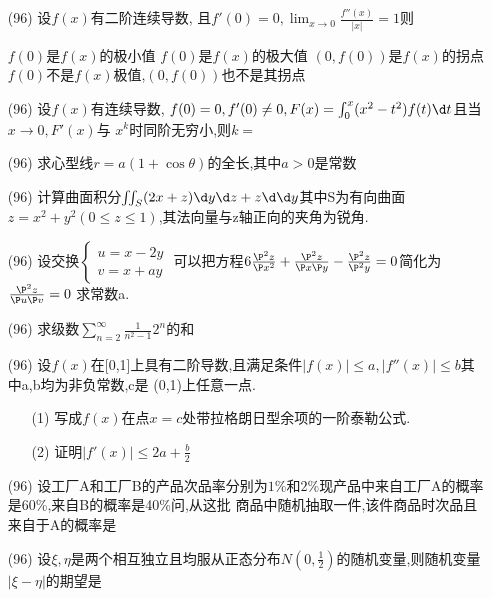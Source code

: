 \documentclass[12pt, a4paper, oneside, UTF8]{ctexbook}
\begin{document}
\begin{enumerate}
    \item [(96)] 设$f(x)$有二阶连续导数, 且$f'(0)=0,\lim_{x\to 0}\frac{f''(x)}{\left|x\right|} = 1$则
    \begin{choices}[1]
        \task $f(0)$是$f(x)$的极小值
        \task $f(0)$是$f(x)$的极大值
        \task $(0, f(0))$是$f(x)$的拐点 
        \task $f(0)$不是$f(x)$极值,$(0,f(0))$也不是其拐点
    \end{choices}
    \item [(96)] 设$f(x)$有连续导数, $f(0) = 0, f'(0) \neq 0, F(x) = \int_{0}^{x}(x^2-t^2)f(t)\d t$且当$x\to 0, F'(x)$与
    $x^k$时同阶无穷小,则$k=$ 
    \item [(96)] 求心型线$r=a(1+\cos\theta)$的全长,其中$a>0$是常数
    \item [(96)] 计算曲面积分$\iint_S(2x+z)\d y\d z + z\d \d y$其中S为有向曲面$z=x^2+y^2(0\leq z\leq 1)$,其法向量与z轴正向的夹角为锐角.
    \item [(96)] 设交换$\begin{cases}
        u = x - 2y \\
        v = x + ay 
    \end{cases}$ 可以把方程$6\frac{\P^2 z}{\P x^2} + \frac{\P^2 z}{\P x\P y}-\frac{\P^2 z}{\P^2 y}=0$简化为$\frac{\P^2 z}{\P u\P v} = 0$ 
    求常数a.
    \item [(96)] 求级数$\sum_{n=2}^{\infty}\frac{1}{n^2-1}2^n$的和
    \item [(96)] 设$f(x)$在[0,1]上具有二阶导数,且满足条件$\left|f(x)\right|\leq a, \left|f''(x)\right|\leq b$其中a,b均为非负常数,c是
    (0,1)上任意一点.
    \begin{enumerate}
        \item [(1)] 写成$f(x)$在点$x=c$处带拉格朗日型余项的一阶泰勒公式. 
        \item [(2)] 证明$\left|f'(x)\right|\leq 2a+\frac{b}{2}$
    \end{enumerate}
    \item [(96)] 设工厂A和工厂B的产品次品率分别为$1\%$和$2\%$现产品中来自工厂A的概率是60\%,来自B的概率是40\%问,从这批
    商品中随机抽取一件,该件商品时次品且来自于A的概率是
    \item [(96)] 设$\xi,\eta$是两个相互独立且均服从正态分布$N(0,\frac{1}{2})$的随机变量,则随机变量$\left|\xi - \eta\right|$的期望是    
\end{enumerate}
\ifx\allfiles\undefined
\end{document}

